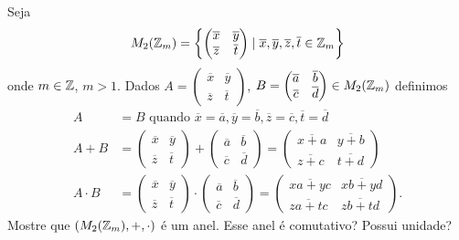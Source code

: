 \documentclass[12pt]{exam}
\begin{document}
    \questao{} Seja
    \[
        M_2(\mathbb{Z}_m) = \left\{\begin{pmatrix}
            \overline{x} & \overline{y}\\\overline{z} & \overline{t}
        \end{pmatrix} \mid \overline{x}, \overline{y}, \overline{z}, \overline{t} \in \mathbb{Z}_m \right\}
    \]
    onde $m \in \mathbb{Z}$, $m > 1$.
    Dados $A = \begin{pmatrix}
            \overline{x} & \overline{y}\\\overline{z} & \overline{t}
        \end{pmatrix}$, $B = \begin{pmatrix}
            \overline{a} & \overline{b}\\\overline{c} & \overline{d}
        \end{pmatrix} \in M_2(\mathbb{Z}_m)$ definimos
    \begin{align*}
        A &= B \mbox{ quando } \overline{x} = \overline{a}, \overline{y} = \overline{b}, \overline{z} = \overline{c}, \overline{t} = \overline{d}\\
        A + B &= \begin{pmatrix}
            \overline{x}& \overline{y}\\\overline{z} &\overline{t}
        \end{pmatrix} + \begin{pmatrix}
            \overline{a} & \overline{b}\\\overline{c} & \overline{d}
        \end{pmatrix} = \begin{pmatrix}
            \overline{x + a} & \overline{y + b}\\\overline{z + c} &\overline{t + d}
        \end{pmatrix}\\
        A \cdot B &= \begin{pmatrix}
            \overline{x}& \overline{y}\\\overline{z} &\overline{t}
        \end{pmatrix} \cdot \begin{pmatrix}
            \overline{a} & \overline{b}\\\overline{c} & \overline{d}
        \end{pmatrix} = \begin{pmatrix}
            \overline{xa + yc} & \overline{xb + yd}\\\overline{za + tc} & \overline{zb + td}
        \end{pmatrix}.
    \end{align*}
    Mostre que $(M_2(\mathbb{Z}_m), + , \cdot)$ \'e um anel. Esse anel \'e comutativo? Possui unidade?
\end{document}
